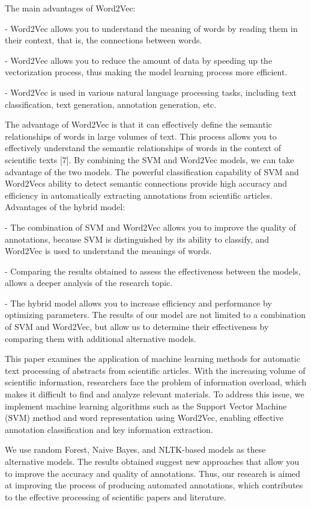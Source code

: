 \documentclass[
]{article}
\begin{document}
The main advantages of Word2Vec:

- Word2Vec allows you to understand the meaning of words by reading them
in their context, that is, the connections between words.

- Word2Vec allows you to reduce the amount of data by speeding up the
vectorization process, thus making the model learning process more
efficient.

- Word2Vec is used in various natural language processing tasks,
including text classification, text generation, annotation generation,
etc.

The advantage of Word2Vec is that it can effectively define the semantic
relationships of words in large volumes of text. This process allows you
to effectively understand the semantic relationships of words in the
context of scientific texts {[}7{]}. By combining the SVM and Word2Vec
models, we can take advantage of the two models. The powerful
classification capability of SVM and Word2Vec\textquotesingle s ability
to detect semantic connections provide high accuracy and efficiency in
automatically extracting annotations from scientific articles.
Advantages of the hybrid model:

- The combination of SVM and Word2Vec allows you to improve the quality
of annotations, because SVM is distinguished by its ability to classify,
and Word2Vec is used to understand the meanings of words.

- Comparing the results obtained to assess the effectiveness between the
models, allows a deeper analysis of the research topic.

- The hybrid model allows you to increase efficiency and performance by
optimizing parameters. The results of our model are not limited to a
combination of SVM and Word2Vec, but allow us to determine their
effectiveness by comparing them with additional alternative models.

This paper examines the application of machine learning methods for
automatic text processing of abstracts from scientific articles. With
the increasing volume of scientific information, researchers face the
problem of information overload, which makes it difficult to find and
analyze relevant materials. To address this issue, we implement machine
learning algorithms such as the Support Vector Machine (SVM) method and
word representation using Word2Vec, enabling effective annotation
classification and key information extraction.

We use random Forest, Naive Bayes, and NLTK-based models as these
alternative models. The results obtained suggest new approaches that
allow you to improve the accuracy and quality of annotations. Thus, our
research is aimed at improving the process of producing automated
annotations, which contributes to the effective processing of scientific
papers and literature.
\end{document}
